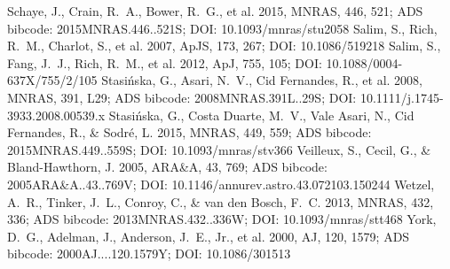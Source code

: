 \documentclass[twocolumn]{aastex631}
\begin{document}
\begin{thebibliography}{}
 Schaye, J., Crain, R.~A., Bower, R.~G., et al. 2015, MNRAS, 446, 521; ADS bibcode: 2015MNRAS.446..521S; DOI: 10.1093/mnras/stu2058
 Salim, S., Rich, R.~M., Charlot, S., et al. 2007, ApJS, 173, 267; DOI: 10.1086/519218
 Salim, S., Fang, J.~J., Rich, R.~M., et al. 2012, ApJ, 755, 105; DOI: 10.1088/0004-637X/755/2/105
 Stasi{\'n}ska, G., Asari, N.~V., Cid Fernandes, R., et al. 2008, MNRAS, 391, L29; ADS bibcode: 2008MNRAS.391L..29S; DOI: 10.1111/j.1745-3933.2008.00539.x
 Stasi{\'n}ska, G., Costa Duarte, M.~V., Vale Asari, N., Cid Fernandes, R., \& Sodr{\'e}, L. 2015, MNRAS, 449, 559; ADS bibcode: 2015MNRAS.449..559S; DOI: 10.1093/mnras/stv366
 Veilleux, S., Cecil, G., \& Bland-Hawthorn, J. 2005, ARA\&A, 43, 769; ADS bibcode: 2005ARA&A..43..769V; DOI: 10.1146/annurev.astro.43.072103.150244
 Wetzel, A.~R., Tinker, J.~L., Conroy, C., \& van den Bosch, F.~C. 2013, MNRAS, 432, 336; ADS bibcode: 2013MNRAS.432..336W; DOI: 10.1093/mnras/stt468
 York, D.~G., Adelman, J., Anderson, J.~E., Jr., et al. 2000, AJ, 120, 1579; ADS bibcode: 2000AJ....120.1579Y; DOI: 10.1086/301513
\end{thebibliography}
\end{document}

